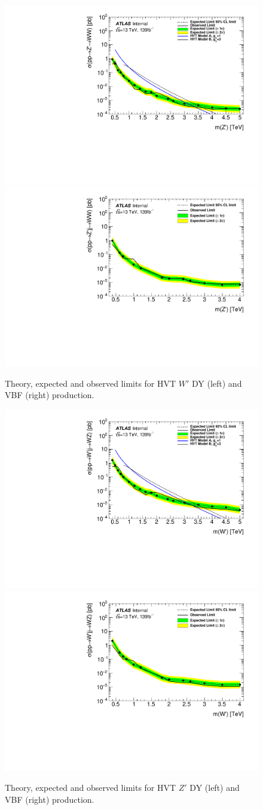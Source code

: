 \begin{figure}[h!]
  \centering
  \includegraphics[width=0.48\hsize]{figures/results/limits/limits_hvtww.pdf}
  \includegraphics[width=0.48\hsize]{figures/results/limits/limits_hvtwwvbf.pdf}

 \caption{Theory, expected and observed limits for HVT $W'$ DY (left) and VBF (right) production.}
  \label{fig:hvtww_limit}
\end{figure} 
\FloatBarrier


\begin{figure}[h!]
  \centering
  \includegraphics[width=0.48\hsize]{figures/results/limits/limits_hvtwz.pdf}
  \includegraphics[width=0.48\hsize]{figures/results/limits/limits_hvtwzvbf.pdf}

 \caption{Theory, expected and observed limits for HVT $Z'$ DY (left) and VBF (right) production.}
  \label{fig:hvtwz_limit}
\end{figure} 
\FloatBarrier

